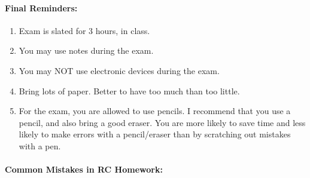\documentclass[a4paper,12pt,leqno]{article}
\begin{document}
\paragraph{\textbf{Final Reminders:}\\}

\begin{enumerate}
\item Exam is slated for 3 hours, in class.
\item You may use notes during the exam.
\item You may NOT use electronic devices during the exam.
\item Bring lots of paper. Better to have too much than too little.
\item For the exam, you are allowed to use pencils. I recommend that you use a pencil, and also bring a good eraser. You are more likely to save time and less likely to make errors with a pencil/eraser than by scratching out mistakes with a pen.
\end{enumerate}

\paragraph{\textbf{Common Mistakes in RC Homework:}\\}
\end{document}
